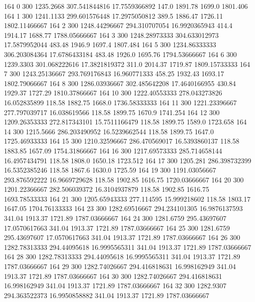 164  0  300  1235.2668  307.541844816  17.7559366892  147.0  1891.78  1699.0  1801.406 
164  1  300  1241.1133  299.601576448  17.2975050812  389.5  1886.47  1726.11  1802.11466667 
164  2  300  1248.44296667  294.310707054  16.9920365943  414.4  1914.17  1688.77  1788.05666667 
164  3  300  1248.28973333  304.633012973  17.5879952044  483.48  1946.9  1697.4  1807.484 
164  5  300  1234.86333333  306.203084364  17.6786433184  483.48  1926.0  1695.76  1794.53666667 
164  6  300  1239.3303  301.068222616  17.3821819372  311.0  2014.37  1719.87  1809.15733333 
164  7  300  1243.25136667  293.769176843  16.960771333  458.25  1932.43  1693.17  1802.79066667 
164  8  300  1286.03936667  302.485642208  17.4640166955  430.84  1929.37  1727.29  1810.37866667 
164  10  300  1222.40553333  278.043273826  16.052835899  118.58  1882.75  1668.0  1736.58333333 
164  11  300  1221.23396667  277.797039717  16.038619566  118.58  1899.75  1670.9  1741.254 
164  12  300  1209.26353333  272.817343101  15.7511166479  118.58  1899.75  1589.0  1723.658 
164  14  300  1215.5666  286.203490952  16.5239662544  118.58  1899.75  1647.0  1725.46933333 
164  15  300  1210.32596667  286.470569017  16.5393860137  118.58  1883.85  1657.09  1754.31866667 
164  16  300  1217.69573333  285.714658144  16.4957434791  118.58  1808.0  1650.18  1723.512 
164  17  300  1205.281  286.398732399  16.5352385246  118.58  1867.6  1630.0  1725.59 
164  19  300  1191.03056667  293.876592222  16.9669729628  118.58  1902.85  1616.75  1720.03666667 
164  20  300  1201.22366667  282.506039372  16.3104937879  118.58  1902.85  1616.75  1693.78533333 
164  21  300  1205.65943333  277.114595  15.999218602  118.58  1803.17  1647.05  1704.76133333 
164  23  300  1282.69516667  294.234101305  16.9876137593  341.04  1913.37  1721.89  1787.03666667 
164  24  300  1281.6759  295.43697607  17.0570617663  341.04  1913.37  1721.89  1787.03666667 
164  25  300  1281.6759  295.43697607  17.0570617663  341.04  1913.37  1721.89  1787.03666667 
164  26  300  1282.78313333  294.44095618  16.9995565311  341.04  1913.37  1721.89  1787.03666667 
164  28  300  1282.78313333  294.44095618  16.9995565311  341.04  1913.37  1721.89  1787.03666667 
164  29  300  1282.74026667  294.416818631  16.998162949  341.04  1913.37  1721.89  1787.03666667 
164  30  300  1282.74026667  294.416818631  16.998162949  341.04  1913.37  1721.89  1787.03666667 
164  32  300  1282.9307  294.363522373  16.9950858882  341.04  1913.37  1721.89  1787.03666667 
